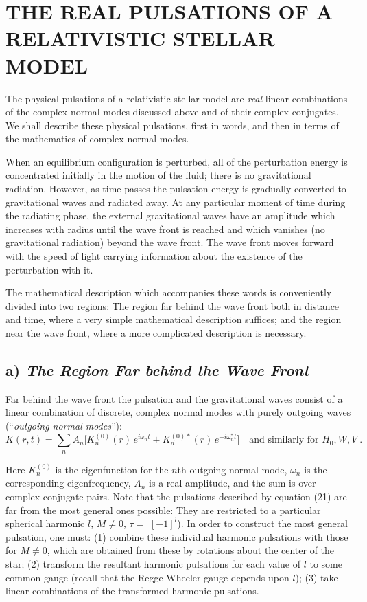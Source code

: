 \documentclass[12pt]{article}
\begin{document}
\section{THE REAL PULSATIONS OF A RELATIVISTIC STELLAR MODEL}

The physical pulsations of a relativistic stellar model are \textit{real} linear combinations of
the complex normal modes discussed above and of their complex conjugates. We shall
describe these physical pulsations, first in words, and then in terms of the mathematics
of complex normal modes.

When an equilibrium configuration is perturbed, all of the perturbation energy is
concentrated initially in the motion of the fluid; there is no gravitational radiation.
However, as time passes the pulsation energy is gradually converted to gravitational
waves and radiated away. At any particular moment of time during the radiating phase,
the external gravitational waves have an amplitude which increases with radius until the
wave front is reached and which vanishes (no gravitational radiation) beyond the wave
front. The wave front moves forward with the speed of light carrying information about
the existence of the perturbation with it.

The mathematical description which accompanies these words is conveniently divided
into two regions: The region far behind the wave front both in distance and time, where
a very simple mathematical description suffices; and the region near the wave front,
where a more complicated description is necessary.

\subsection*{a) \textit{The Region Far behind the Wave Front}}

Far behind the wave front the pulsation and the gravitational waves consist of a
linear combination of discrete, complex normal modes with purely outgoing waves
(``\textit{outgoing normal modes}''):
\begin{equation}
  K(r,t) = \sum_n A_n \bigl[ K_n^{(0)}(r)\, e^{i\omega_n t} + K_n^{(0)*}(r)\, e^{-i\omega_n^* t} \bigr]
  \quad \text{and similarly for } H_0, W, V \;.
\label{eq:21}
\end{equation}

Here $K_n^{(0)}$ is the eigenfunction for the $n$th outgoing normal mode, $\omega_n$ is the
corresponding eigenfrequency, $A_n$ is a real amplitude, and the sum is over complex
conjugate pairs. Note that the pulsations described by equation (21) are far from the
most general ones possible: They are restricted to a particular spherical harmonic
$l$, $M \neq 0$, $\tau =$
$[-1]^l$). In order to construct the most general pulsation, one must: (1) combine these
individual harmonic pulsations with those for $M \neq 0$, which are obtained from these by
rotations about the center of the star; (2) transform the resultant harmonic pulsations
for each value of $l$ to some common gauge (recall that the Regge-Wheeler gauge depends
upon $l$); (3) take linear combinations of the transformed harmonic pulsations.
\end{document}

